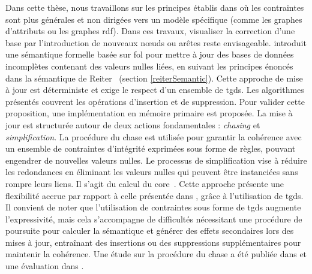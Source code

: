 Dans cette thèse, nous travaillons sur les principes établis dans \cite{chabinConsistentUpdatingDatabases2020} où les contraintes sont plus générales et non dirigées vers un modèle spécifique (comme les graphes d'attributs ou les graphes \gls{rdf}).
Dans ces travaux, visualiser la correction d'une base par l'introduction de nouveaux nœuds ou arêtes reste envisageable.
\cite{chabinConsistentUpdatingDatabases2020} introduit une sémantique formelle basée sur \gls{fol} pour mettre à jour des bases de données incomplètes contenant des valeurs nulles liées, en suivant les principes énoncés dans la sémantique de Reiter~\cite{reiterSoundSometimesComplete1986} (section \ref{reiterSemantic}).
Cette approche de mise à jour est déterministe et exige le respect d'un ensemble de \glspl{tgd}.
Les algorithmes présentés couvrent les opérations d'insertion et de suppression.
Pour valider cette proposition, une implémentation en mémoire primaire est proposée.
La mise à jour est structurée autour de deux actions fondamentales : \emph{chasing} et \emph{simplification}.
La procédure du \gls{chase} est utilisée pour garantir la cohérence avec un ensemble de contraintes d'intégrité exprimées sous forme de règles, pouvant engendrer de nouvelles valeurs nulles.
Le processus de simplification vise à réduire les redondances en éliminant les valeurs nulles qui peuvent être instanciées sans rompre leurs liens.
Il s'agit du calcul du \gls{core}~\cite{faginDataExchangeGetting2005}.
Cette approche présente une flexibilité accrue par rapport à celle présentée dans \cite{chabinUsingGraphGrammar2019}, grâce à l'utilisation de \glspl{tgd}.
Il convient de noter que l'utilisation de contraintes sous forme de \glspl{tgd} augmente l'expressivité, mais cela s'accompagne de difficultés nécessitant une procédure de poursuite pour calculer la sémantique et générer des effets secondaires lors des mises à jour, entraînant des insertions ou des suppressions supplémentaires pour maintenir la cohérence.
Une étude sur la procédure du \gls{chase} a été publiée dans \cite{onetChaseProcedureIts2013} et une évaluation dans \cite{benediktBenchmarkingChase2017}.
